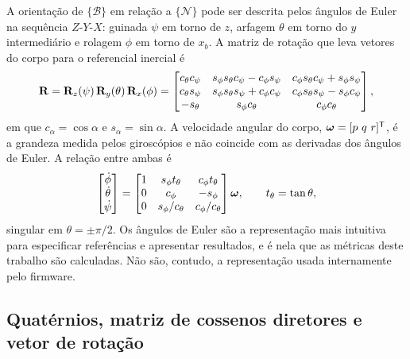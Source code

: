 A orientação de $\{\mathcal{B}\}$ em relação a $\{\mathcal{N}\}$ pode ser
descrita pelos ângulos de Euler na sequência $Z$-$Y$-$X$: guinada $\psi$ em
torno de $z$, arfagem $\theta$ em torno do $y$ intermediário e rolagem $\phi$
em torno de $x_b$. A matriz de rotação que leva vetores do corpo para o
referencial inercial é~\cite{beard2008,sabatino2015,beard2012}
\begin{equation}
\mathbf{R} = \mathbf{R}_z(\psi)\,\mathbf{R}_y(\theta)\,\mathbf{R}_x(\phi) =
\begin{bmatrix}
c_\theta c_\psi & s_\phi s_\theta c_\psi - c_\phi s_\psi & c_\phi s_\theta c_\psi + s_\phi s_\psi \\
c_\theta s_\psi & s_\phi s_\theta s_\psi + c_\phi c_\psi & c_\phi s_\theta s_\psi - s_\phi c_\psi \\
-s_\theta       & s_\phi c_\theta                         & c_\phi c_\theta
\end{bmatrix},
\label{eq:rotacao}
\end{equation}
em que $c_\alpha = \cos\alpha$ e $s_\alpha = \sin\alpha$. A velocidade
angular do corpo, $\bm{\omega} = [p\ q\ r]^{\mathsf{T}}$, é a grandeza
medida pelos giroscópios e não coincide com as derivadas dos ângulos de Euler.
A relação entre ambas é~\cite{beard2012}
\begin{equation}
\begin{bmatrix} \dot\phi \\ \dot\theta \\ \dot\psi \end{bmatrix} =
\begin{bmatrix}
1 & s_\phi t_\theta & c_\phi t_\theta \\
0 & c_\phi          & -s_\phi \\
0 & s_\phi/c_\theta & c_\phi/c_\theta
\end{bmatrix}
\bm{\omega},
\qquad t_\theta = \tan\theta,
\label{eq:cinematica-euler}
\end{equation}
singular em $\theta = \pm\pi/2$. Os ângulos de Euler são a representação mais
intuitiva para especificar referências e apresentar resultados, e é nela que
as métricas deste trabalho são calculadas. Não são, contudo, a representação
usada internamente pelo firmware.

\subsection{Quatérnios, matriz de cossenos diretores e vetor de rotação}

